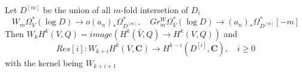 \documentclass[leqno]{amsart}
\newcommand{\C}{\mathbf C}
\newcommand{\1}{\mathbf{1}}
\theoremstyle{definition}
\theoremstyle{remark}
\begin{document}
Let $D^{[m]}$ be the union of all $m$-fold
intersetion of  $D_i$
 \[
	 W_m\Omega_{\bar{V}}^*(\log D)
	 \to o
	 (a_n)_*\Omega_{D^{[m]}}^*,\quad
	 Gr^W_m \Omega_{\bar{V}}^*(\log D) \to 
	 (a_n)_*\Omega_{D^{[m]}}^*[-m]
\]
Then
$W_kH^k(V,Q)=image(
H^k(\bar{V},Q)\to H^k(V,Q))$
and 
\[
	Res[i]\colon 
	W_{k+i} H^k(V,\C)\to 
	H^{k-i}(D^{[i]},\C),\quad i\geq0
\]
with the kernel being $W_{k+i+1}$




\end{document}
